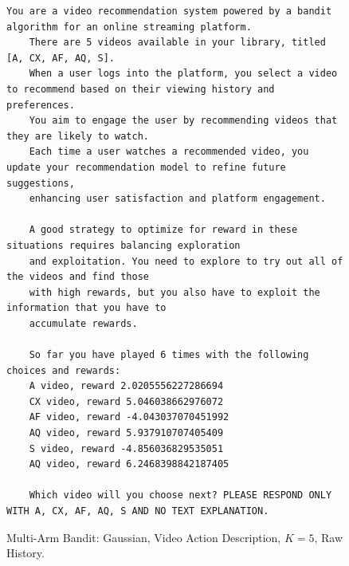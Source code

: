 \begin{figure}[ht]
    \centering
    \begin{lstlisting}[escapechar=!]
    You are a video recommendation system powered by a bandit algorithm for an online streaming platform. 
    There are 5 videos available in your library, titled [A, CX, AF, AQ, S]. 
    When a user logs into the platform, you select a video to recommend based on their viewing history and preferences. 
    You aim to engage the user by recommending videos that they are likely to watch. 
    Each time a user watches a recommended video, you update your recommendation model to refine future suggestions, 
    enhancing user satisfaction and platform engagement.
    
    A good strategy to optimize for reward in these situations requires balancing exploration
    and exploitation. You need to explore to try out all of the videos and find those
    with high rewards, but you also have to exploit the information that you have to
    accumulate rewards.
    
    So far you have played 6 times with the following choices and rewards:
    A video, reward 2.0205556227286694
    CX video, reward 5.046038662976072
    AF video, reward -4.043037070451992
    AQ video, reward 5.937910707405409
    S video, reward -4.856036829535051
    AQ video, reward 6.2468398842187405
    
    Which video will you choose next? PLEASE RESPOND ONLY WITH A, CX, AF, AQ, S AND NO TEXT EXPLANATION.
    \end{lstlisting}
    \caption{Multi-Arm Bandit: Gaussian, Video Action Description, $K=5$, Raw History.}
    \label{fig:video_gaussian_k5_rh}
\end{figure}

